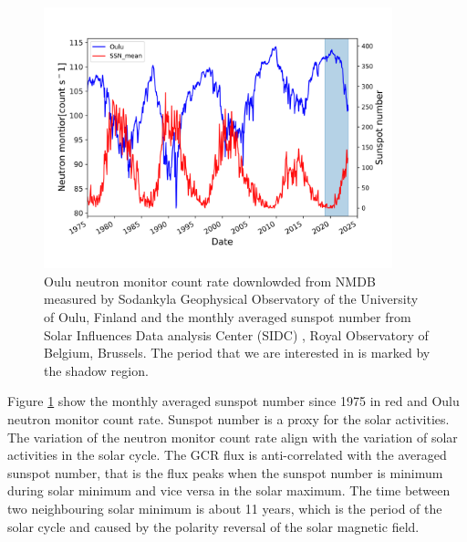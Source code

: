 \begin{figure}[htbp]
	\centering
	\includegraphics[width = 0.9\textwidth]{images/Solar_modulation.png}
	\caption[Sunspot number and Neutron monitor count data]{Oulu neutron monitor count rate downlowded from \ac{NMDB} \footnotemark[1] measured by Sodankyla Geophysical Observatory of the University of Oulu, Finland and the monthly averaged sunspot number from Solar Influences Data analysis Center (SIDC) \footnotemark[2], Royal Observatory of Belgium, Brussels. The period that we are interested in is marked by the shadow region.}
	\label{Fig:Solar_modulation}
\end{figure}


Figure \ref{Fig:Solar_modulation} show the monthly averaged sunspot number since 1975 in red and Oulu neutron monitor count rate.
Sunspot number is a proxy for the solar activities. The variation of the neutron monitor count rate align with the variation of solar activities in the solar cycle.
The GCR flux is anti-correlated with the averaged sunspot number, that is the flux peaks when the sunspot number is minimum during solar minimum and vice versa in the solar maximum. The time between two neighbouring solar minimum is about 11 years, which is the period of the solar cycle and caused by the polarity reversal of the solar magnetic field.


